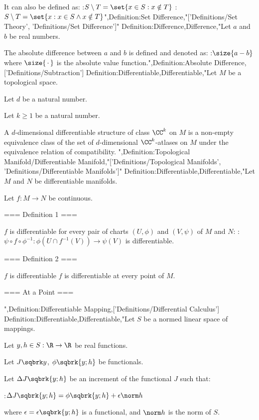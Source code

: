 It can also be defined as:
:$S \setminus T = \set {x \in S: x \notin T}$
:$S \setminus T = \set {x: x \in S \land x \notin T}$",Definition:Set Difference,"['Definitions/Set Theory', 'Definitions/Set Difference']"
Definition:Difference,Difference,"Let $a$ and $b$ be real numbers.

The absolute difference between $a$ and $b$ is defined and denoted as:
:$\size {a - b}$
where $\size {\, \cdot \,}$ is the absolute value function.",Definition:Absolute Difference,['Definitions/Subtraction']
Definition:Differentiable,Differentiable,"Let $M$ be a topological space.

Let $d$ be a natural number.

Let $k \ge 1$ be a natural number.



A $d$-dimensional differentiable structure of class $\CC^k$ on $M$ is a non-empty equivalence class of the set of $d$-dimensional $\CC^k$-atlases on $M$ under the equivalence relation of compatibility.
",Definition:Topological Manifold/Differentiable Manifold,"['Definitions/Topological Manifolds', 'Definitions/Differentiable Manifolds']"
Definition:Differentiable,Differentiable,"Let $M$ and $N$ be differentiable manifolds.

Let $f : M \to N$ be continuous.

=== Definition 1 ===

$f$  is differentiable  for every pair of charts $(U, \phi)$ and $(V,\psi)$ of $M$ and $N$:
:$\psi\circ f\circ \phi^{-1} : \phi ( U \cap f^{-1}(V)) \to \psi(V)$
is differentiable.


=== Definition 2 ===


$f$  is differentiable  $f$ is  differentiable at every point of $M$.


=== At a Point ===

",Definition:Differentiable Mapping,['Definitions/Differential Calculus']
Definition:Differentiable,Differentiable,"Let $S$ be a normed linear space of mappings.

Let $y, h \in S: \R \to \R$ be real functions.

Let $J \sqbrk y$, $\phi \sqbrk {y; h}$ be functionals.

Let $\Delta J \sqbrk {y; h}$ be an increment of the functional $J$ such that:

:$\Delta J \sqbrk {y; h} = \phi \sqbrk {y;h} + \epsilon \norm h$

where $\epsilon = \epsilon \sqbrk {y; h}$ is a functional, and $\norm h$ is the norm of $S$.

